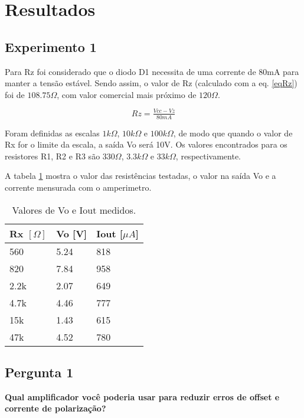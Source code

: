 \newpage

\section{Resultados}

\subsection{Experimento 1}
Para Rz foi considerado que o diodo D1 necessita de uma corrente de 80mA para manter a tensão estável. Sendo assim, o valor de Rz (calculado com a eq. \ref{eqRz}) foi de $108.75 \Omega$, com valor comercial mais próximo de $120 \Omega$.

\begin{equation}
Rz = \tfrac{Vcc - Vz}{80mA}
\label{eqRz}
\end{equation}

Foram definidas as escalas $1k \Omega$, $10k \Omega$  e $100k \Omega$, de modo que quando o valor de Rx for o limite da escala, a saída Vo será 10V. Os valores encontrados para os resistores R1, R2 e R3 são $330 \Omega$, $3.3k \Omega$  e  $33k \Omega$, respectivamente.

A tabela \ref{tab1} mostra o valor das resistências testadas, o valor na saída Vo e a corrente mensurada com o amperimetro.

\begin{small}
\begin{table}[H]
\begin{center}
\caption{Valores de Vo e Iout medidos.}

\begin{tabular}{l|l|l}
\hline
Rx $[\Omega]$ & Vo [V]& Iout [$\mu A$]\\
\hline
560 & 5.24 & 818\\
\hline
820 &  7.84 & 958\\
\hline
2.2k & 2.07 & 649\\
\hline
4.7k & 4.46 & 777\\
\hline
15k & 1.43 & 615\\
\hline
47k & 4.52 & 780\\
\hline

\end{tabular}
\label{tab1}
\end{center}
\end{table}
\end{small}

\subsection{Pergunta 1}
\textbf{Qual amplificador você poderia usar para reduzir erros de offset e corrente de polarização?}

